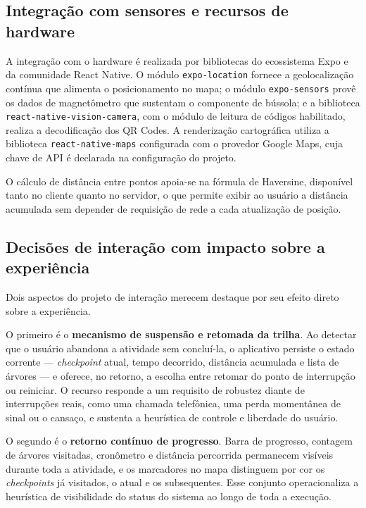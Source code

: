 \subsection{Integração com sensores e recursos de hardware}

A integração com o hardware é realizada por bibliotecas do ecossistema Expo e da
comunidade React Native. O módulo \texttt{expo-location} fornece a geolocalização
contínua que alimenta o posicionamento no mapa; o módulo \texttt{expo-sensors}
provê os dados de magnetômetro que sustentam o componente de bússola; e a
biblioteca \texttt{react-native-vision-camera}, com o módulo de leitura de códigos
habilitado, realiza a decodificação dos QR Codes. A renderização cartográfica
utiliza a biblioteca \texttt{react-native-maps} configurada com o provedor Google
Maps, cuja chave de API é declarada na configuração do projeto.

O cálculo de distância entre pontos apoia-se na fórmula de Haversine, disponível
tanto no cliente quanto no servidor, o que permite exibir ao usuário a distância
acumulada sem depender de requisição de rede a cada atualização de posição.

\subsection{Decisões de interação com impacto sobre a experiência}

Dois aspectos do projeto de interação merecem destaque por seu efeito direto sobre
a experiência.

O primeiro é o \textbf{mecanismo de suspensão e retomada da trilha}. Ao detectar
que o usuário abandona a atividade sem concluí-la, o aplicativo persiste o estado
corrente --- \textit{checkpoint} atual, tempo decorrido, distância acumulada e
lista de árvores --- e oferece, no retorno, a escolha entre retomar do ponto de
interrupção ou reiniciar. O recurso responde a um requisito de robustez diante de
interrupções reais, como uma chamada telefônica, uma perda momentânea de sinal ou
o cansaço, e sustenta a heurística de controle e liberdade do usuário.

O segundo é o \textbf{retorno contínuo de progresso}. Barra de progresso, contagem
de árvores visitadas, cronômetro e distância percorrida permanecem visíveis
durante toda a atividade, e os marcadores no mapa distinguem por cor os
\textit{checkpoints} já visitados, o atual e os subsequentes. Esse conjunto
operacionaliza a heurística de visibilidade do status do sistema ao longo de toda
a execução.

